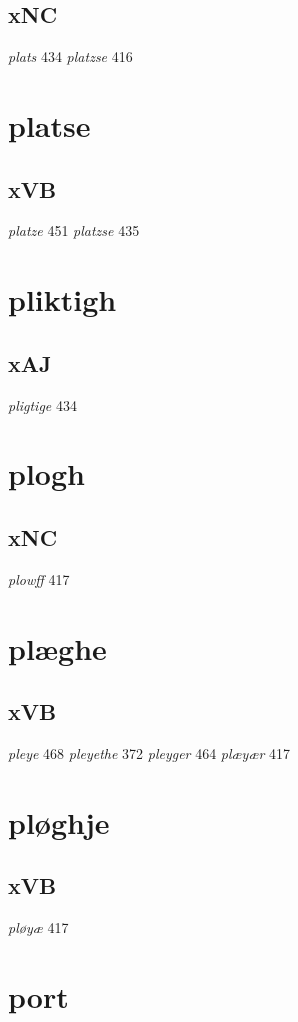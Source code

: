 \documentclass[a4paper,twocolumn]{article}
\begin{document}
\subsection{xNC}
\label{sec:org202a15e}
\emph{plats} 434 \emph{platzse} 416 
\section{platse}
\label{sec:orgbb6d518}
\subsection{xVB}
\label{sec:orgc43abe2}
\emph{platze} 451 \emph{platzse} 435 
\section{pliktigh}
\label{sec:org0a75269}
\subsection{xAJ}
\label{sec:org5157649}
\emph{pligtige} 434 
\section{plogh}
\label{sec:org6c6de42}
\subsection{xNC}
\label{sec:orgce834b9}
\emph{plowff} 417 
\section{plæghe}
\label{sec:org5e8e7db}
\subsection{xVB}
\label{sec:orgfafe398}
\emph{pleye} 468 \emph{pleyethe} 372 \emph{pleyger} 464 \emph{plæyær} 417 
\section{pløghje}
\label{sec:org770148c}
\subsection{xVB}
\label{sec:orge154f45}
\emph{pløyæ} 417 
\section{port}
\label{sec:orgc7aae14}
\end{document}
